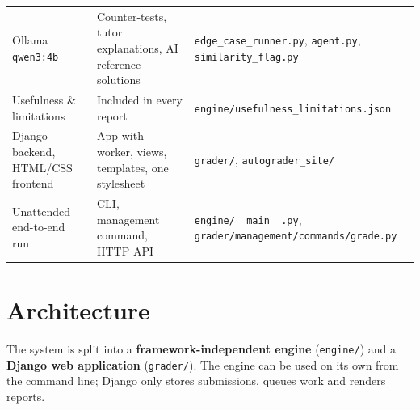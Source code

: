 \documentclass[11pt,a4paper]{article}
\newcommand{\file}[1]{\nolinkurl{#1}}
\begin{document}
\begin{longtable}{@{}>{\raggedright\arraybackslash}p{4.3cm}>{\raggedright\arraybackslash}p{5.2cm}>{\raggedright\arraybackslash}p{5.6cm}@{}}
Ollama \texttt{qwen3:4b} & Counter-tests, tutor explanations, AI reference solutions & \file{edge_case_runner.py}, \file{agent.py}, \file{similarity_flag.py} \\
Usefulness \& limitations & Included in every report & \file{engine/usefulness_limitations.json} \\
Django backend, HTML/CSS frontend & App with worker, views, templates, one stylesheet & \file{grader/}, \file{autograder_site/} \\
Unattended end-to-end run & CLI, management command, HTTP API & \file{engine/__main__.py}, \file{grader/management/commands/grade.py} \\
\bottomrule
\end{longtable}

\section{Architecture}
The system is split into a \textbf{framework-independent engine} (\file{engine/}) and a
\textbf{Django web application} (\file{grader/}). The engine can be used on its own from the command
line; Django only stores submissions, queues work and renders reports.
\end{document}
